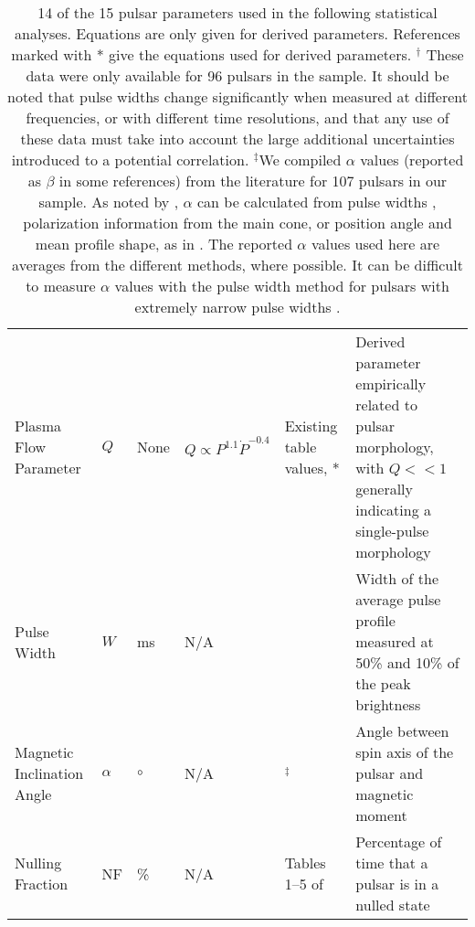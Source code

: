 \documentclass[fleqn,usenatbib]{mnras}
\begin{document}
\begin{table*}
\begin{tabular}{p{2.75cm}p{1cm}p{1cm}p{2cm}p{3cm}p{3cm}}
        Plasma Flow Parameter & $Q$ & None & $Q \propto P^{1.1}\Dot{P}^{-0.4}$& Existing table values, \citet{beskin1984spin}* & Derived parameter empirically related to pulsar morphology, with $Q<<1$ generally indicating a single-pulse morphology \citep{beskin2009mhd}\\
        
        Pulse Width & $W$ & ms & N/A & \citet{Manchester_2005} & Width of the average pulse profile measured at 50\% and 10\% of the peak brightness\\
        
        Magnetic Inclination Angle & $\alpha$ & $\circ$ & N/A & \citet{Malov1990, malov2011angles, Nikitina2017}$^\ddag$ & Angle between spin axis of the pulsar and magnetic moment\\
        
        Nulling Fraction & NF & \% & N/A & Tables 1--5 of \citet{Konar2019} & Percentage of time that a pulsar is in a nulled state\\
        \hline
    \end{tabular}
    \caption{14 of the 15 pulsar parameters used in the following statistical analyses. Equations are only given for derived parameters. References marked with * give the equations used for derived parameters. \newline \newline
    $^\dagger$ These data were only available for 96 pulsars in the sample. It should be noted that pulse widths change significantly when measured at different frequencies, or with different time resolutions, and that any use of these data must take into account the large additional uncertainties introduced to a potential correlation. \newline \newline
    $^\ddag$We compiled $\alpha$ values (reported as $\beta$ in some references) from the literature for 107 pulsars in our sample. As noted by \citet{Nikitina2017}, $\alpha$ can be calculated from pulse widths \citep[assuming that the line of sight passes through the center of the radiation cone as in][]{rankin1990toward}, polarization information from the main cone, or position angle and mean profile shape, as in \citet{lyne1988shape}. The reported $\alpha$ values used here are averages from the different methods, where possible. It can be difficult to measure $\alpha$ values with the pulse width method for pulsars with extremely narrow pulse widths \citep[e.g., J1717-4054, ][]{Kerr2014}.}
    \label{tab:data_table}
\end{table*}
\end{document}
